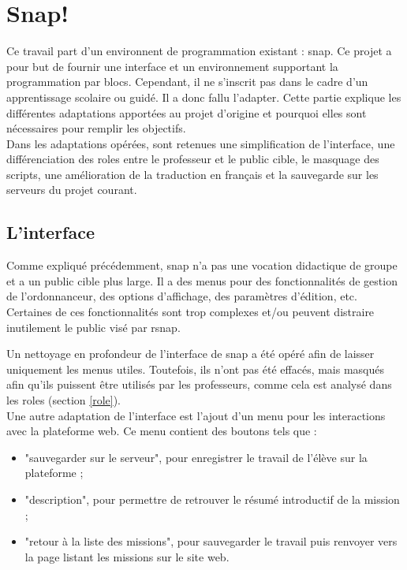 \section{Snap!}
\label{solution SNAP}
Ce travail part d'un environnent de programmation existant : \gls{snap}. Ce projet a pour but de fournir une interface et un environnement supportant la programmation par \glspl{bloc}. Cependant, il ne s'inscrit pas dans le cadre d'un apprentissage scolaire ou guidé. Il a donc fallu l'adapter. Cette partie explique les différentes adaptations apportées au projet d'origine et pourquoi elles sont nécessaires pour remplir les objectifs.\\

Dans les adaptations opérées, sont retenues une simplification de l'interface, une différenciation des \glspl{role} entre le professeur et le public cible, le masquage des \glspl{script}, une amélioration de la traduction en français et la sauvegarde sur les serveurs du projet courant.

\subsection{L'interface}
\label{interface}
Comme expliqué précédemment, \gls{snap} n'a pas une vocation didactique de groupe et a un public cible plus large. Il a des menus pour des fonctionnalités de gestion de l'ordonnanceur, des options d'affichage, des paramètres d'édition, etc. Certaines de ces fonctionnalités sont trop complexes et/ou peuvent distraire inutilement le public visé par \gls{rsnap}.

Un nettoyage en profondeur de l'interface de \gls{snap} a été opéré afin de laisser uniquement les menus utiles. Toutefois, ils n'ont pas été effacés, mais masqués afin qu'ils puissent être utilisés par les professeurs, comme cela est analysé dans les \glspl{role} (section \ref{role}).\\

Une autre adaptation de l'interface est l'ajout d'un menu pour les interactions avec la plateforme web. Ce menu contient des boutons tels que :
\begin{itemize}
  \item "sauvegarder sur le serveur", pour enregistrer le travail de l'élève sur la plateforme ;
  \item "description", pour permettre de retrouver le résumé introductif de la \gls{mission} ;
  \item "retour à la liste des missions", pour sauvegarder le travail puis renvoyer vers la page listant les \glspl{mission} sur le site web.
\end{itemize}

